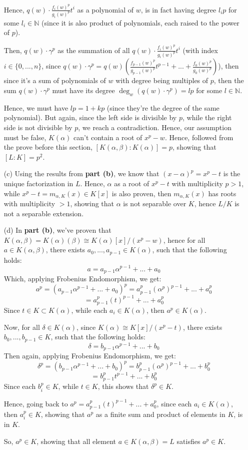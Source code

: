 \documentclass{article}
\begin{document}
\begin{itemize}
    Hence, $q(w)\cdot \frac{f_i(w)^p}{g_i(w)^p}t^i$ as a polynomial of $w$, is in fact having degree $l_ip$ for some $l_i\in\mathbb{N}$ (since it is also product of polynomials, each raised to the power of $p$).

    Then, $q(w)\cdot \gamma^p$ as the summation of all $q(w)\cdot \frac{f_i(w)^p}{g_i(w)^p}t^i$ (with index $i\in \{0,...,n\}$, since $q(w)\cdot \gamma^p = q(w)\left(\frac{f_{p-1}(w)^p}{g_{p-1}(w)^p}t^{p-1}+...+\frac{f_0(w)^p}{g_0(w)^p}\right)$), then since it's a sum of polynomials of $w$ with degree being multiples of $p$, then the sum $q(w)\cdot \gamma^p$ must have its degree $\deg_w(q(w)\cdot \gamma^p) = lp$ for some $l\in\mathbb{N}$.

    Hence, we must have $lp = 1+kp$ (since they're the degree of the same polynomial). But again, since the left side is divisible by $p$, while the right side is not divisible by $p$, we reach a contradiction.
    Hence, our assumption must be false, $K(\alpha)$ can't contain a root of $x^p-w$. Hence, followed from the prove before this section, $[K(\alpha,\beta):K(\alpha)] = p$,
    showing that $[L:K]=p^2$.

    \hfil
    
    \item[(c)] Using the results from \textbf{part (b)}, we know that $(x-\alpha)^p = x^p-t$ is the unique factorization in $L$. Hence, $\alpha$ as a root of $x^p-t$ with multiplicity $p>1$, while $x^p-t=m_{\alpha,K}(x)\in K[x]$ is also proven, then $m_{\alpha,K}(x)$ has roots with multiplicity $>1$, showing that $\alpha$ is not separable over $K$, hence $L/K$ is not a separable extension.

    \hfil

    \item[(d)] In \textbf{part (b)}, we've proven that $K(\alpha,\beta)=K(\alpha)(\beta) \cong K(\alpha)[x]/(x^p-w)$, hence for all $a\in K(\alpha,\beta)$, there exists $a_0,...,a_{p-1}\in K(\alpha)$, such that the following holds:
    $$a = a_{p-1}\alpha^{p-1}+...+a_0$$
    Which, applying Frobenius Endomorphism, we get:
    $$a^p = (a_{p-1}\alpha^{p-1}+...+a_0)^p = a_{p-1}^p(\alpha^p)^{p-1}+...+a_0^p$$
    $$ = a_{p-1}^p(t)^{p-1}+...+a_0^p$$
    Since $t\in K\subset K(\alpha)$, while each $a_i\in K(\alpha)$, then $a^p\in K(\alpha)$.

    Now, for all $\delta\in K(\alpha)$, since $K(\alpha)\cong K[x]/(x^p-t)$, there exists $b_0,...,b_{p-1}\in K$, such that the following holds:
    $$\delta = b_{p-1}\alpha^{p-1}+...+b_0$$
    Then again, applying Frobenius Endomorphism, we get:
    $$\delta^p = (b_{p-1}\alpha^{p-1}+...+b_0)^p = b_{p-1}^p(\alpha^p)^{p-1}+...+b_0^p$$
    $$ = b_{p-1}^pt^{p-1}+...+b_0^p$$
    Since each $b_i^p \in K$, while $t\in K$, this shows that $\delta^p \in K$.

    Hence, going back to $a^p = a_{p-1}^p(t)^{p-1}+...+a_0^p$, since each $a_i\in K(\alpha)$, then $a_i^p\in K$, showing that $a^p$ as a finite sum and product of elements in $K$, is in $K$.

    So, $a^p\in K$, showing that all element $a\in K(\alpha,\beta)=L$ satisfies $a^p\in K$.
\end{itemize}
\end{document}
